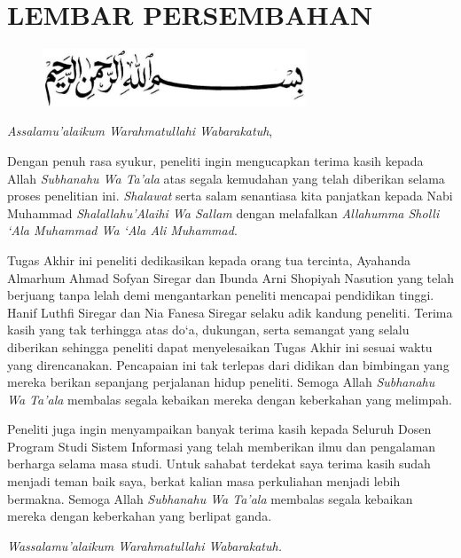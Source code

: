 %
%
%
%

\chapter*{LEMBAR PERSEMBAHAN}

\begin{figure}
	\centering
	\includegraphics[width=0.7\textwidth]{konten/gambar/bismillah.jpg}
\end{figure}

\textit{Assalamu’alaikum Warahmatullahi Wabarakatuh},

Dengan penuh rasa syukur, peneliti ingin mengucapkan terima kasih kepada Allah \textit{Subhanahu Wa Ta’ala} atas segala kemudahan yang telah diberikan selama proses penelitian ini. \textit{Shalawat} serta salam senantiasa kita panjatkan kepada Nabi Muhammad \textit{Shalallahu’Alaihi Wa Sallam} dengan melafalkan \textit{Allahumma Sholli `Ala Muhammad Wa `Ala Ali Muhammad}.

Tugas Akhir ini peneliti dedikasikan kepada orang tua tercinta, Ayahanda Almarhum Ahmad Sofyan Siregar dan Ibunda Arni Shopiyah Nasution yang telah berjuang tanpa lelah demi mengantarkan peneliti mencapai pendidikan tinggi. Hanif Luthfi Siregar dan Nia Fanesa Siregar selaku adik kandung peneliti. Terima kasih yang tak terhingga atas do`a, dukungan, serta semangat yang selalu diberikan sehingga peneliti dapat menyelesaikan Tugas Akhir ini sesuai waktu yang direncanakan. Pencapaian ini tak terlepas dari didikan dan bimbingan yang mereka berikan sepanjang perjalanan hidup peneliti. Semoga Allah \textit{Subhanahu Wa Ta’ala} membalas segala kebaikan mereka dengan keberkahan yang melimpah.

Peneliti juga ingin menyampaikan banyak terima kasih kepada Seluruh Dosen Program Studi Sistem Informasi yang telah memberikan ilmu dan pengalaman berharga selama masa studi. Untuk sahabat terdekat saya terima kasih sudah menjadi teman baik saya, berkat kalian masa perkuliahan menjadi lebih bermakna. Semoga Allah \textit{Subhanahu Wa Ta’ala} membalas segala kebaikan mereka dengan keberkahan yang berlipat ganda.

\textit{Wassalamu’alaikum Warahmatullahi Wabarakatuh.}
